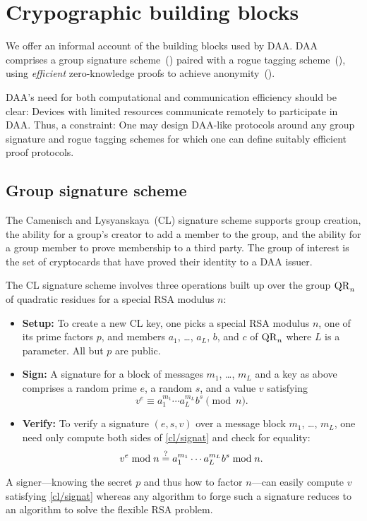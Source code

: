 \section{Crypographic building blocks}

We offer an informal account of the building blocks used by DAA.
DAA comprises a group signature scheme~() paired with a rogue tagging scheme~(), using \emph{efficient} zero-knowledge proofs to achieve anonymity~().

DAA's need for both computational and communication efficiency should be clear:
Devices with limited resources communicate remotely to participate in DAA.
Thus, a constraint: One may design DAA-like protocols around any group
signature and rogue tagging schemes for which one can define suitably efficient
proof protocols.

\subsection{Group signature scheme}

The Camenisch and Lysyanskaya~(CL) signature scheme
supports group creation,
the ability for a group's creator to add a member to the group,
and the ability for a group member to prove membership to a third party.
The group of interest is the set of cryptocards that have proved
their identity to a DAA issuer.

The CL signature scheme
involves three operations built up over the group $\mathrm{QR}_n$
of quadratic residues for a special RSA modulus $n$:
\begin{itemize}

\item \textbf{Setup:} To create a new CL key,
one picks a special RSA modulus $n$, one of its prime
factors $p$,
and members $a_1$, \ldots, $a_L$, $b$, and $c$ of $\mathrm{QR}_n$
where $L$ is a parameter.
All but $p$ are public.

\item \textbf{Sign:}
A signature for a block of messages $m_1$, \ldots, $m_L$
and a key as above comprises a random prime $e$, a random $s$, and a
value $v$ satisfying
\begin{equation}\label{cl/signat}
	v^e \equiv a_1^{m_1} \cdots a_L^{m_L} b^s \pmod n.
\end{equation}

\item \textbf{Verify:}
To verify a signature $(e, s, v)$ over a message block $m_1$, \ldots, $m_L$,
one need only compute both sides of \eqref{cl/signat} and check for equality:
$$	
	v^e \bmod n \mathrel{\overset{\mathrm{?}}{=}} a_1^{m_1} \cdots a_L^{m_L} b^s \bmod n.
$$
\end{itemize}
A signer---knowing the secret $p$ and thus how to factor $n$---can
easily compute $v$ satisfying \eqref{cl/signat}
whereas any algorithm to forge such a signature
reduces to an algorithm to solve the flexible RSA problem.

